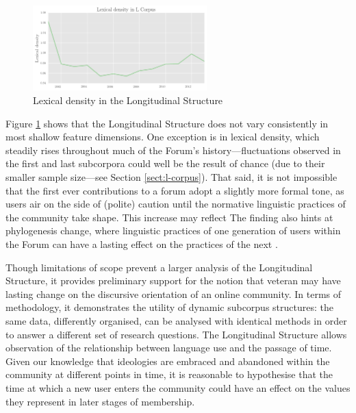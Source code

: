 \begin{figure}[htb]
\centering
\includegraphics[width=0.6\textwidth]{../images/lexical-density-in-l-corpus.png}
\caption{Lexical density in the Longitudinal Structure}
\label{fig:lex_dens_L}
\end{figure}

Figure \ref{fig:lex_dens_L} shows that the Longitudinal Structure does not vary consistently in most shallow feature dimensions. One exception is in lexical density, which steadily rises throughout much of the \gls{Forum}'s history---fluctuations observed in the first and last subcorpora could well be the result of chance (due to their smaller sample size---see Section \ref{sect:l-corpus}). That said, it is not impossible that the first ever contributions to a \gls{forum} adopt a slightly more formal tone, as users air on the side of (polite) caution until the normative linguistic practices of the community take shape. This increase may reflect  The finding also hints at phylogenesis change, where linguistic practices of one generation of users within the \gls{Forum} can have a lasting effect on the practices of the next \cite{danescu-niculescu-mizil_no_2013}.

Though limitations of scope prevent a larger analysis of the Longitudinal Structure, it provides preliminary support for the notion that veteran  may have lasting change on the discursive orientation of an online community. In terms of methodology, it demonstrates the utility of dynamic subcorpus structures: the same data, differently organised, can be analysed with identical methods in order to answer a different set of research questions. The Longitudinal Structure allows observation of the relationship between language use and the passage of time. Given our knowledge that ideologies are embraced and abandoned within the community at different points in time, it is reasonable to hypothesise that the time at which a new user enters the community could have an effect on the values they represent in later stages of membership. 

